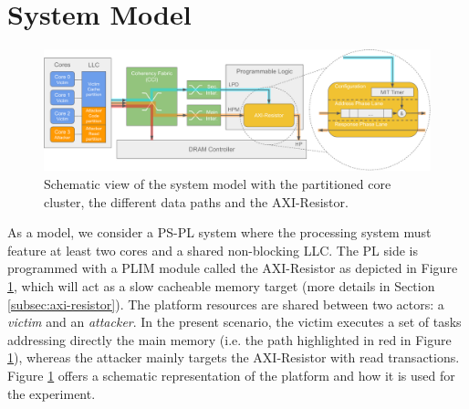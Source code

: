 \section{System Model}
    \label{sec:system_model}
    \begin{figure}
        \centering
        \includegraphics[scale=0.56]{images/Evaluation_setup.pdf}
        \caption{Schematic view of the system model with the partitioned core cluster, the different data paths and the AXI-Resistor.}
        \label{fig:system_schematic}
    \end{figure}

    As a model, we consider a PS-PL system where the processing system must feature at least two cores and a shared non-blocking LLC.
    The PL side is programmed with a PLIM module called the AXI-Resistor as depicted in Figure \ref{fig:system_schematic}, which will act as a slow cacheable memory target (more details in Section \ref{subsec:axi-resistor}).
    The platform resources are shared between two actors: a \emph{victim} and an \emph{attacker}.
    In the present scenario, the victim executes a set of tasks addressing directly the main memory (i.e. the path highlighted in red in Figure \ref{fig:system_schematic}), whereas the attacker mainly targets the AXI-Resistor with read transactions.
    Figure \ref{fig:system_schematic} offers a schematic representation of the platform and how it is used for the experiment.


